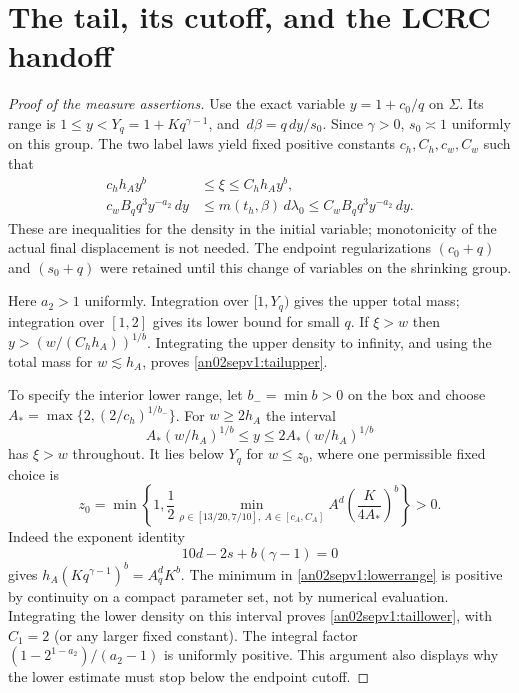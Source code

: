\documentclass[11pt]{article}
\theoremstyle{remark}\newtheorem{remark}[theorem]{Remark}
\newcommand{\dd}{\,d}
\begin{document}
\section{The tail, its cutoff, and the LCRC handoff}
\begin{proof}[Proof of the measure assertions]
Use the exact variable $y=1+c_0/q$ on $\Sigma$.
Its range is $1\le y<Y_q=1+Kq^{\gamma-1}$, and
$\dd\beta=q\dd y/s_0$.
Since $\gamma>0$, $s_0\asymp1$ uniformly on this group.
The two label laws yield fixed positive constants
$c_h,C_h,c_w,C_w$ such that
\begin{align}
 c_h h_A y^b&\le\xi\le C_h h_A y^b,\nonumber\\
 c_w B_q q^3y^{-a_2}\dd y
    &\le m(t_h,\beta)\dd\lambda_0
       \le C_w B_q q^3y^{-a_2}\dd y.
 \label{an02sepv1:density}
\end{align}
These are inequalities for the density in the initial variable;
monotonicity of the actual final displacement is not needed.
The endpoint regularizations $(c_0+q)$ and $(s_0+q)$ were
retained until this change of variables on the shrinking group.

Here $a_2>1$ uniformly. Integration over $[1,Y_q)$ gives
the upper total mass; integration over $[1,2]$ gives its
lower bound for small $q$. If $\xi>w$ then
$y>(w/(C_hh_A))^{1/b}$. Integrating the upper density to
infinity, and using the total mass for $w\lesssim h_A$, proves
\eqref{an02sepv1:tailupper}.

To specify the interior lower range, let $b_-=\min b>0$ on
the box and choose
$A_*=\max\{2,(2/c_h)^{1/b_-}\}$.
For $w\ge2h_A$ the interval
\[
 A_*(w/h_A)^{1/b}\le y\le2A_*(w/h_A)^{1/b}
\]
has $\xi>w$ throughout. It lies below $Y_q$ for $w\le z_0$,
where one permissible fixed choice is
\begin{equation}
 z_0=\min\left\{1,\frac12
    \min_{\rho\in[13/20,7/10],\ A\in[c_A,C_A]}
                      A^d\left(\frac K{4A_*}\right)^b\right\}>0.
 \label{an02sepv1:lowerrange}
\end{equation}
Indeed the exponent identity
\begin{equation}
 10d-2s+b(\gamma-1)=0
 \label{an02sepv1:cutoffidentity}
\end{equation}
gives $h_A(Kq^{\gamma-1})^b=A_q^dK^b$.
The minimum in \eqref{an02sepv1:lowerrange} is positive by
continuity on a compact parameter set, not by numerical
evaluation. Integrating the lower density on this interval
proves \eqref{an02sepv1:taillower}, with $C_1=2$ (or any
larger fixed constant). The integral factor
$(1-2^{1-a_2})/(a_2-1)$ is uniformly positive.
This argument also displays why the lower estimate must stop
below the endpoint cutoff.


\end{proof}
\end{document}
